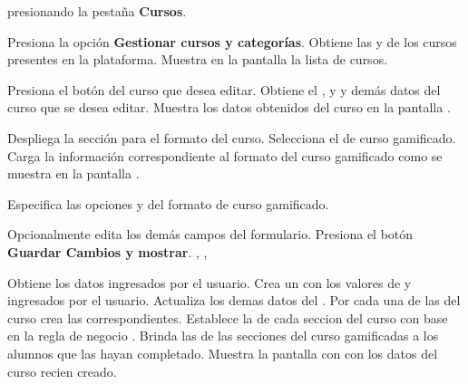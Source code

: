 \begin{UCtrayectoria}%
%
  presionando la pestaña {\bf Cursos}.

  \Actor Presiona la opción {\bf Gestionar cursos y categorías}.
  \Sistema Obtiene las  y 
            de los cursos presentes en la plataforma.
  \Sistema Muestra en la pantalla  la lista de cursos.
           \label{CU-E05-course-list}

  \Actor Presiona el botón \IUConfigurar del curso que desea editar.
  \Sistema Obtiene el ,  y
            y demás datos del curso que se desea editar.
  \Sistema Muestra los datos obtenidos del curso en la pantalla .


  \Actor Despliega la sección para el formato del curso.
  \Actor Selecciona el  de curso gamificado.
  \Sistema Carga la información correspondiente al formato del curso gamificado
           como se muestra en la pantalla .

  \Actor Especifica las opciones  y
          del formato de curso gamificado. 

  \Actor Opcionalmente edita los demás campos del formulario.
  \Actor Presiona el botón {\bf Guardar Cambios y mostrar}. , ,
          \label{CU-E05-submit}

  \Sistema Obtiene los datos ingresados por el usuario.
  \Sistema Crea un  con los valores de  
           y  ingresados por el usuario.
  \Sistema Actualiza los demas datos del .
  \Sistema Por cada una de las  del curso crea las
            correspondientes.
  \Sistema Establece la  de cada seccion del curso con base 
           en la regla de negocio .
  \Sistema Brinda las  de las secciones del curso
           gamificadas a los alumnos que las hayan completado. \label{CU-E05-finish}
  \Sistema Muestra la pantalla con  con los datos del curso recien
           creado.

\end{UCtrayectoria}

